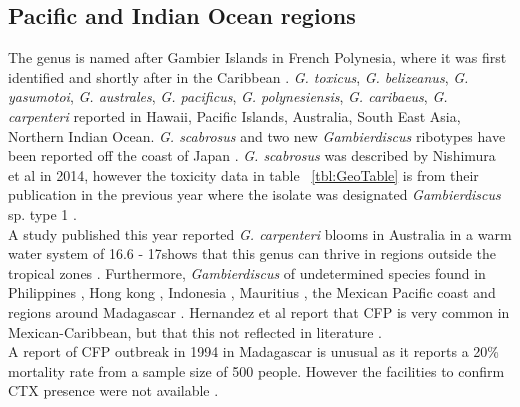 \documentclass[12pt]{article}
\begin{document}
\subsection{Pacific and Indian Ocean regions}
The genus is named after Gambier Islands in French Polynesia, where it was first identified \cite{adachi1979thecal} and shortly after in the Caribbean \cite{besada1982observations}.
\emph{G. toxicus}, \emph{G. belizeanus}, \emph{G. yasumotoi}, \emph{G. australes}, \emph{G. pacificus}, \emph{G. polynesiensis}, \emph{G. caribaeus}, \emph{G. carpenteri} reported in Hawaii, Pacific Islands, Australia, South East Asia, Northern Indian Ocean.
\emph{G. scabrosus} and two new \emph{Gambierdiscus} ribotypes have been reported off the coast of Japan \cite{nishimura2013genetic,nishimura2014morphology}. \emph{G. scabrosus} was described by Nishimura et al in 2014, however the toxicity data in table ~\ref{tbl:GeoTable} is from their publication in the previous year where the isolate was designated \emph{Gambierdiscus} sp. type 1 \cite{nishimura2013genetic,nishimura2014morphology}. \\
A study published this year reported \emph{G. carpenteri} blooms in Australia in a warm water system of 16.6 - 17\celsius shows that this genus can thrive in regions outside the tropical zones \cite{kohli2014high}.
Furthermore, \emph{Gambierdiscus} of undetermined species found in Philippines \cite{gillespie1987possible}, Hong kong \cite{lu2004harmful}, Indonesia \cite{praseno1996hab}, Mauritius \cite{hurbungs2002seasonal}, the Mexican Pacific coast \cite{ceballos2006analisis} and regions around Madagascar \cite{grzebyk1994ecology}. Hernandez et al report that CFP is very common in Mexican-Caribbean, but that this not reflected in literature \cite{hernandez2004species}.\\
A report of CFP outbreak in 1994 in Madagascar is unusual as it reports a 20\% mortality rate from a sample size of 500 people. However the facilities to confirm CTX presence were not available \cite{habermehl1994severe}. 
\end{document}

